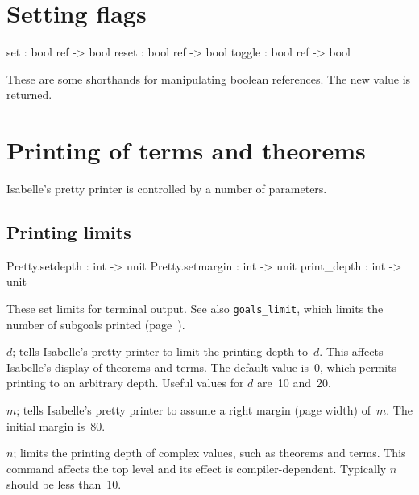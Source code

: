\section{Setting flags}
\begin{ttbox}
set     : bool ref -> bool
reset   : bool ref -> bool
toggle  : bool ref -> bool
\end{ttbox}
These are some shorthands for manipulating boolean references.  The new
value is returned.


\section{Printing of terms and theorems}\label{sec:printing-control}
Isabelle's pretty printer is controlled by a number of parameters.

\subsection{Printing limits}
\begin{ttbox} 
Pretty.setdepth  : int -> unit
Pretty.setmargin : int -> unit
print_depth      : int -> unit
\end{ttbox}
These set limits for terminal output.  See also {\tt goals_limit}, which
limits the number of subgoals printed (page~\pageref{sec:goals-printing}).

\begin{ttdescription}
\item[\ttindexbold{Pretty.setdepth} \(d\);]  
  tells Isabelle's pretty printer to limit the printing depth to~$d$.  This
  affects Isabelle's display of theorems and terms.  The default value
  is~0, which permits printing to an arbitrary depth.  Useful values for
  $d$ are~10 and~20.

\item[\ttindexbold{Pretty.setmargin} \(m\);]  
  tells Isabelle's pretty printer to assume a right margin (page width)
  of~$m$.  The initial margin is~80.

\item[\ttindexbold{print_depth} \(n\);]  
  limits the printing depth of complex \ML{} values, such as theorems and
  terms.  This command affects the \ML{} top level and its effect is
  compiler-dependent.  Typically $n$ should be less than~10.
\end{ttdescription}


